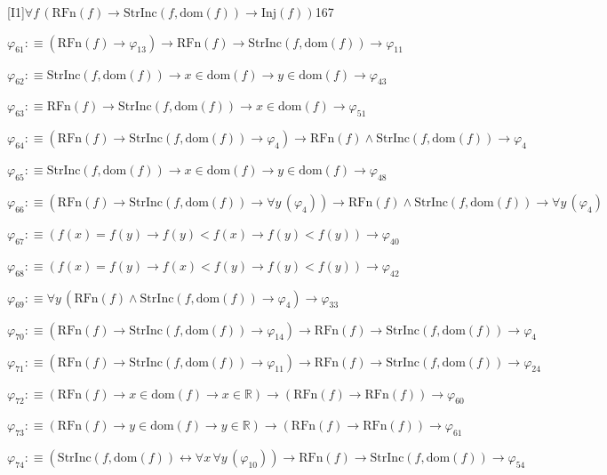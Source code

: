 \begin{fullproof}{[I1]}{$\forall f\,(\mathrm{RFn}(f) \to \mathrm{StrInc}(f,\mathrm{dom}(f)) \to \mathrm{Inj}(f))$}{167}
\begin{abbrevlist}
\item $\varphi_{61} :\equiv (\mathrm{RFn}(f) \to \varphi_{13}) \to \mathrm{RFn}(f) \to \mathrm{StrInc}(f,\mathrm{dom}(f)) \to \varphi_{11}$
\item $\varphi_{62} :\equiv \mathrm{StrInc}(f,\mathrm{dom}(f)) \to x \in \mathrm{dom}(f) \to y \in \mathrm{dom}(f) \to \varphi_{43}$
\item $\varphi_{63} :\equiv \mathrm{RFn}(f) \to \mathrm{StrInc}(f,\mathrm{dom}(f)) \to x \in \mathrm{dom}(f) \to \varphi_{51}$
\item $\varphi_{64} :\equiv (\mathrm{RFn}(f) \to \mathrm{StrInc}(f,\mathrm{dom}(f)) \to \varphi_{4}) \to \mathrm{RFn}(f) \land \mathrm{StrInc}(f,\mathrm{dom}(f)) \to \varphi_{4}$
\item $\varphi_{65} :\equiv \mathrm{StrInc}(f,\mathrm{dom}(f)) \to x \in \mathrm{dom}(f) \to y \in \mathrm{dom}(f) \to \varphi_{48}$
\item $\varphi_{66} :\equiv (\mathrm{RFn}(f) \to \mathrm{StrInc}(f,\mathrm{dom}(f)) \to \forall y\,(\varphi_{4})) \to \mathrm{RFn}(f) \land \mathrm{StrInc}(f,\mathrm{dom}(f)) \to \forall y\,(\varphi_{4})$
\item $\varphi_{67} :\equiv (f(x) = f(y) \to f(y) < f(x) \to f(y) < f(y)) \to \varphi_{40}$
\item $\varphi_{68} :\equiv (f(x) = f(y) \to f(x) < f(y) \to f(y) < f(y)) \to \varphi_{42}$
\item $\varphi_{69} :\equiv \forall y\,(\mathrm{RFn}(f) \land \mathrm{StrInc}(f,\mathrm{dom}(f)) \to \varphi_{4}) \to \varphi_{33}$
\item $\varphi_{70} :\equiv (\mathrm{RFn}(f) \to \mathrm{StrInc}(f,\mathrm{dom}(f)) \to \varphi_{14}) \to \mathrm{RFn}(f) \to \mathrm{StrInc}(f,\mathrm{dom}(f)) \to \varphi_{4}$
\item $\varphi_{71} :\equiv (\mathrm{RFn}(f) \to \mathrm{StrInc}(f,\mathrm{dom}(f)) \to \varphi_{11}) \to \mathrm{RFn}(f) \to \mathrm{StrInc}(f,\mathrm{dom}(f)) \to \varphi_{24}$
\item $\varphi_{72} :\equiv (\mathrm{RFn}(f) \to x \in \mathrm{dom}(f) \to x \in \mathbb{R}) \to (\mathrm{RFn}(f) \to \mathrm{RFn}(f)) \to \varphi_{60}$
\item $\varphi_{73} :\equiv (\mathrm{RFn}(f) \to y \in \mathrm{dom}(f) \to y \in \mathbb{R}) \to (\mathrm{RFn}(f) \to \mathrm{RFn}(f)) \to \varphi_{61}$
\item $\varphi_{74} :\equiv (\mathrm{StrInc}(f,\mathrm{dom}(f)) \leftrightarrow \forall x\,\forall y\,(\varphi_{10})) \to \mathrm{RFn}(f) \to \mathrm{StrInc}(f,\mathrm{dom}(f)) \to \varphi_{54}$

\end{abbrevlist}
\end{fullproof}

